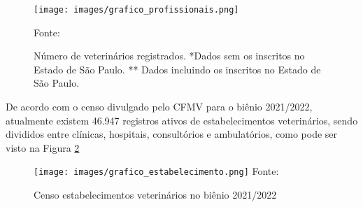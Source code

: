 \documentclass[
    12pt,               %
    openright,          %
    oneside,
    a4paper,            %
    BIBLATEX,           %
    TODO,               %
    english,            %
    brazil              %
    ]{ifsp-spo-inf-ctds}
\providecommand{\DIFaddbegin}{} %
\newcommand{\DIFaddincludegraphics}[2][]{{\color{blue}\fbox{\DIFOincludegraphics[#1]{#2}}}} %
\DeclareRobustCommand{\DIFaddbegin}{\DIFOaddbegin \let\includegraphics\DIFaddincludegraphics} %
\begin{document}
    \begin{figure}[H]
        \centering
        \texttt{[image: images/grafico\_profissionais.png]}
        \caption{Número de veterinários registrados. *Dados sem os inscritos no Estado de São Paulo. ** Dados incluindo os inscritos no Estado de São Paulo.}
        \footnotesize {Fonte:  }
        \label{fig:grafico vet}
    \end{figure}

    De acordo com o censo divulgado pelo CFMV para o biênio 2021/2022, atualmente existem 46.947 registros ativos de estabelecimentos veterinários, sendo divididos entre clínicas, hospitais, consultórios e ambulatórios, como pode ser visto                            na Figura \ref{fig:grafico clinicas} 

    \begin{figure}[H]
        \centering
        \caption{Censo estabelecimentos veterinários no biênio 2021/2022}
        \texttt{[image: images/grafico\_estabelecimento.png]}
        \footnotesize{ Fonte: }
        \label{fig:grafico clinicas}
    \end{figure}

\DIFaddbegin 


\end{document}
